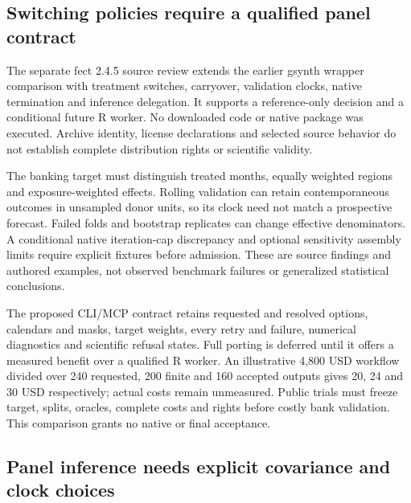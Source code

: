 \hypertarget{switching-policies-require-a-qualified-panel-contract}{%
\subsection{Switching policies require a qualified panel
contract}\label{switching-policies-require-a-qualified-panel-contract}}

The separate fect 2.4.5 source review extends the earlier gsynth wrapper
comparison with treatment switches, carryover, validation clocks, native
termination and inference delegation. It supports a reference-only
decision and a conditional future R worker. No downloaded code or native
package was executed. Archive identity, license declarations and
selected source behavior do not establish complete distribution rights
or scientific validity. \citep{exec24_fect_source,exec24_fect_choice}

The banking target must distinguish treated months, equally weighted
regions and exposure-weighted effects. Rolling validation can retain
contemporaneous outcomes in unsampled donor units, so its clock need not
match a prospective forecast. Failed folds and bootstrap replicates can
change effective denominators. A conditional native iteration-cap
discrepancy and optional sensitivity assembly limits require explicit
fixtures before admission. These are source findings and authored
examples, not observed benchmark failures or generalized statistical
conclusions. \citep{exec24_fect_source,exec24_fect_choice}

The proposed CLI/MCP contract retains requested and resolved options,
calendars and masks, target weights, every retry and failure, numerical
diagnostics and scientific refusal states. Full porting is deferred
until it offers a measured benefit over a qualified R worker. An
illustrative 4,800 USD workflow divided over 240 requested, 200 finite
and 160 accepted outputs gives 20, 24 and 30 USD respectively; actual
costs remain unmeasured. Public trials must freeze target, splits,
oracles, complete costs and rights before costly bank validation. This
comparison grants no native or final acceptance.
\citep{exec24_fect_choice}

\hypertarget{panel-inference-needs-explicit-covariance-and-clock-choices}{%
\subsection{Panel inference needs explicit covariance and clock
choices}\label{panel-inference-needs-explicit-covariance-and-clock-choices}}

